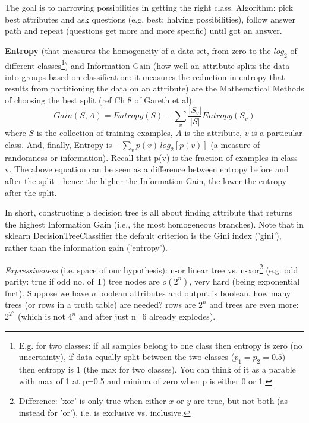 \documentclass[11pt]{article}
\begin{document}
The goal is to narrowing possibilities in getting the right class. Algorithm: pick best attributes and ask questions (e.g. best: halving possibilities), follow answer path and repeat (questions get more and more specific) until got an answer. 

\textbf{Entropy} (that measures the homogeneity of a data set, from zero to the $log_2$ of different classes\footnote{E.g. for two classes: if all samples belong to one class then entropy is zero (no uncertainty), if data equally split between the two classes ($p_1 = p_2 = 0.5$) then entropy is 1 (the max for two classes). You can think of it as a parable with max of 1 at p=0.5 and minima of zero when p is either 0 or 1,}) and Information Gain (how well an attribute splits the data into groups based on classification: it measures the reduction in entropy that results from partitioning the data on an attribute) are the Mathematical Methods of choosing the best split (ref Ch 8 of Gareth et al):
\[ Gain(S, A) = Entropy(S) - \sum_v \frac{|S_v|}{|S|} Entropy(S_v)
\]
where $S$ is the collection of training examples, $A$ is the attribute, $v$ is a particular class. And, finally, Entropy is $-\sum_v p(v) \,log_2[p(v)]$ (a measure of randomness or information). Recall that p(v) is the fraction of examples in class v. The above equation can be seen as a difference between entropy before and after the split - hence the higher the Information Gain, the lower the entropy after the split.

In short, constructing a decision tree is all about finding attribute that returns the highest Information Gain (i.e., the most homogeneous branches). Note that in sklearn DecisionTreeClassifier the default criterion is the Gini index ('gini'), rather than the information gain ('entropy').  

\textit{Expressiveness} (i.e. space of our hypothesis): n-or linear tree vs. n-xor\footnote{Difference: 'xor' is only true when either $x$ or $y$ are true, but not both (as instead for 'or'), i.e. is exclusive vs. inclusive.} (e.g. odd parity: true if odd no. of T) tree nodes are $o(2^n)$, very hard (being exponential fnct). 
Suppose we have $n$ boolean attributes and output is boolean, how many trees (or rows in a truth table) are needed? rows are $2^n$ and trees are even more: $2^{2^n}$ (which is not $4^n$ and after just n=6 already explodes). 
\end{document}
